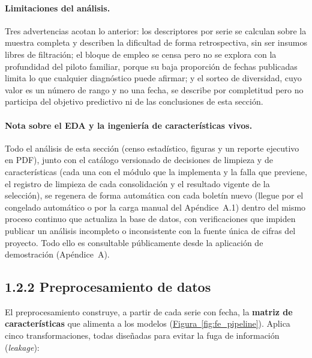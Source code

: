 \documentclass[12pt,letterpaper]{report}
\begin{document}
\paragraph{Limitaciones del análisis.} Tres advertencias acotan lo anterior: los descriptores
por serie se calculan sobre la muestra completa y describen la dificultad de forma retrospectiva,
sin ser insumos libres de filtración; el bloque de empleo se censa pero no se explora con la
profundidad del piloto familiar, porque su baja proporción de fechas publicadas limita lo que
cualquier diagnóstico puede afirmar; y el sorteo de diversidad, cuyo valor es un número de rango y
no una fecha, se describe por completitud pero no participa del objetivo predictivo ni de las
conclusiones de esta sección.

\paragraph{Nota sobre el EDA y la ingeniería de características vivos.} Todo el análisis de
esta sección (censo estadístico, figuras y un reporte ejecutivo en PDF), junto con el catálogo
versionado de \feFactNCleanDecisions{} decisiones de limpieza y \feFactNFeDecisions{} de
características (cada una con el módulo que la implementa y la falla que previene, el registro de
limpieza de cada consolidación y el resultado vigente de la selección), se regenera de forma
automática con cada boletín nuevo (llegue por el congelado automático o por la carga manual del
Apéndice~A.1) dentro del mismo proceso continuo que actualiza la base de datos, con verificaciones que impiden publicar un análisis incompleto o inconsistente con la
fuente única de cifras del proyecto. Todo ello es consultable públicamente desde la aplicación de
demostración (Apéndice~A).

\subsection{1.2.2 Preprocesamiento de datos}

El preprocesamiento construye, a partir de cada serie con fecha, la \textbf{matriz de
características} que alimenta a los modelos (\hyperref[fig:fe_pipeline]{Figura~\ref*{fig:fe_pipeline}}). Aplica cinco
transformaciones, todas diseñadas para evitar la fuga de información (\textit{leakage}):
\end{document}
